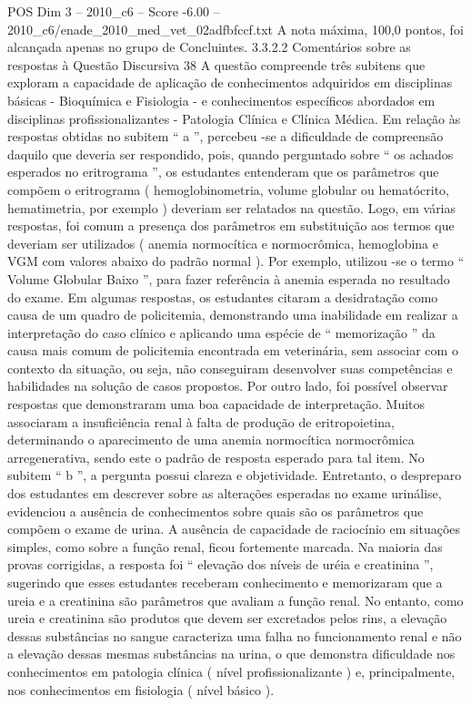\begin{textsample}{POS Dim 3 – 2010\_c6 – Score -6.00 – 2010\_c6/enade\_2010\_med\_vet\_02adfbfccf.txt}
A nota máxima, 100,0 pontos, foi alcançada apenas no grupo de Concluintes. 3.3.2.2 Comentários sobre as respostas à Questão Discursiva 38 A questão compreende três subitens que exploram a capacidade de aplicação de conhecimentos adquiridos em disciplinas básicas - Bioquímica e Fisiologia - e conhecimentos específicos abordados em disciplinas profissionalizantes - Patologia Clínica e Clínica Médica.
Em relação às respostas obtidas no subitem “ a ”, percebeu -se a dificuldade de compreensão daquilo que deveria ser respondido, pois, quando perguntado sobre “ os achados esperados no eritrograma ”, os estudantes entenderam que os parâmetros que compõem o eritrograma ( hemoglobinometria, volume globular ou hematócrito, hematimetria, por exemplo ) deveriam ser relatados na questão.
Logo, em várias respostas, foi comum a presença dos parâmetros em substituição aos termos que deveriam ser utilizados ( anemia normocítica e normocrômica, hemoglobina e VGM com valores abaixo do padrão normal ).
Por exemplo, utilizou -se o termo “ Volume Globular Baixo ”, para fazer referência à anemia esperada no resultado do exame.
Em algumas respostas, os estudantes citaram a desidratação como causa de um quadro de policitemia, demonstrando uma inabilidade em realizar a interpretação do caso clínico e aplicando uma espécie de “ memorização ” da causa mais comum de policitemia encontrada em veterinária, sem associar com o contexto da situação, ou seja, não conseguiram desenvolver suas competências e habilidades na solução de casos propostos.
Por outro lado, foi possível observar respostas que demonstraram uma boa capacidade de interpretação.
Muitos associaram a insuficiência renal à falta de produção de eritropoietina, determinando o aparecimento de uma anemia normocítica normocrômica arregenerativa, sendo este o padrão de resposta esperado para tal item.
No subitem “ b ”, a pergunta possui clareza e objetividade.
Entretanto, o despreparo dos estudantes em descrever sobre as alterações esperadas no exame urinálise, evidenciou a ausência de conhecimentos sobre quais são os parâmetros que compõem o exame de urina.
A ausência de capacidade de raciocínio em situações simples, como sobre a função renal, ficou fortemente marcada.
Na maioria das provas corrigidas, a resposta foi “ elevação dos níveis de uréia e creatinina ”, sugerindo que esses estudantes receberam conhecimento e memorizaram que a ureia e a creatinina são parâmetros que avaliam a função renal.
No entanto, como ureia e creatinina são produtos que devem ser excretados pelos rins, a elevação dessas substâncias no sangue caracteriza uma falha no funcionamento renal e não a elevação dessas mesmas substâncias na urina, o que demonstra dificuldade nos conhecimentos em patologia clínica ( nível profissionalizante ) e, principalmente, nos conhecimentos em fisiologia ( nível básico ).

\end{textsample}
